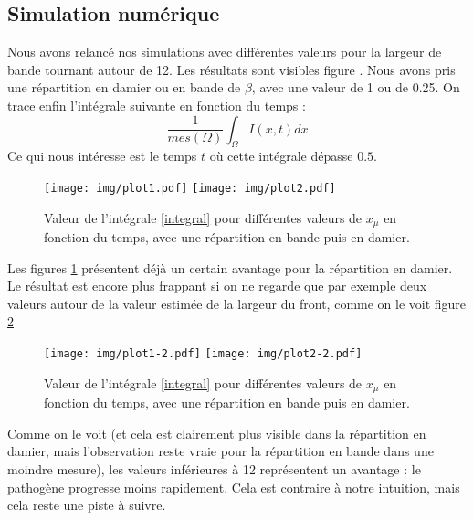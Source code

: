 \documentclass{article}
\begin{document}
\subsection{Simulation numérique}
Nous avons relancé nos simulations avec différentes valeurs pour la largeur de bande tournant autour de 12. Les résultats sont visibles figure \label{figProp1}. Nous avons pris une répartition en damier ou en bande de $\beta$, avec une valeur de 1 ou de 0.25. On trace enfin l'intégrale suivante en fonction du temps :
\begin{equation}\label{integral}
	\frac{1}{mes(\Omega)}\int_\Omega I(x,t) dx
\end{equation}
Ce qui nous intéresse est le temps $t$ où cette intégrale dépasse $0.5$.
\begin{figure}[!h]
\centering
	\texttt{[image: img/plot1.pdf]}
	\texttt{[image: img/plot2.pdf]}
\caption{Valeur de l'intégrale \ref{integral} pour différentes valeurs de $x_{\mu}$ en fonction du temps, avec une répartition en bande puis en damier.}
\label{figProp1}
\end{figure}

Les figures \ref{figProp1} présentent déjà un certain avantage pour la répartition en damier. Le résultat est encore plus frappant si on ne regarde que par exemple deux valeurs autour de la valeur estimée de la largeur du front, comme on le voit figure \ref{figProp2}

\begin{figure}[!h]
\centering
	\texttt{[image: img/plot1-2.pdf]}
	\texttt{[image: img/plot2-2.pdf]}
\caption{Valeur de l'intégrale \ref{integral} pour différentes valeurs de $x_{\mu}$ en fonction du temps, avec une répartition en bande puis en damier.}
\label{figProp2}
\end{figure}

Comme on le voit (et cela est clairement plus visible dans la répartition en damier, mais l'observation reste vraie pour la répartition en bande dans une moindre mesure), les valeurs inférieures à 12 représentent un avantage : le pathogène progresse moins rapidement. Cela est contraire à notre intuition, mais cela reste une piste à suivre.

%
\clearpage
\end{document}
